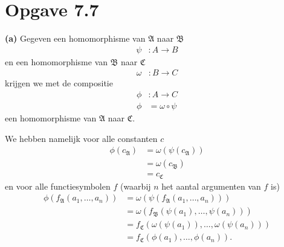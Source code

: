 \documentclass[a4paper,11pt]{article}
\begin{document}
\section*{Opgave 7.7}

\begin{description}

\item{\bf (a)} %
Gegeven een homomorphisme van $\mathfrak{A}$ naar $\mathfrak{B}$
\begin{align*}
\psi &: A \rightarrow B
\end{align*}
en een homomorphisme van $\mathfrak{B}$ naar $\mathfrak{C}$
\begin{align*}
\omega &: B \rightarrow C
\end{align*}
krijgen we met de compositie
\begin{align*}
\phi &: A \rightarrow C \\
\phi &= \omega \circ \psi
\end{align*}
een homomorphisme van $\mathfrak{A}$ naar $\mathfrak{C}$.

We hebben namelijk voor alle constanten $c$
\begin{align*}
\phi(c_{\mathfrak{A}}) &= \omega(\psi(c_{\mathfrak{A}})) \\
                       &= \omega(c_{\mathfrak{B}}) \\
                       &= c_{\mathfrak{C}}
\end{align*}
en voor alle functiesymbolen $f$ (waarbij $n$ het aantal argumenten van $f$
is)
\begin{align*}
\phi(f_{\mathfrak{A}}(a_{1}, \ldots, a_{n})) &=
                                             \omega(\psi(f_{\mathfrak{A}}(a_{1},
                                             \ldots, a_{n}))) \\
                                             &=
                                             \omega(f_{\mathfrak{B}}(\psi(a_{1}),
                                             \ldots, \psi(a_{n}))) \\
                                             &=
                                             f_{\mathfrak{C}}(\omega(\psi(a_{1})),
                                             \ldots, \omega(\psi(a_{n}))) \\
                                             &=
                                             f_{\mathfrak{C}}(\phi(a_{1}),
                                             \ldots, \phi(a_{n})).
\end{align*}


\end{description}
\end{document}
